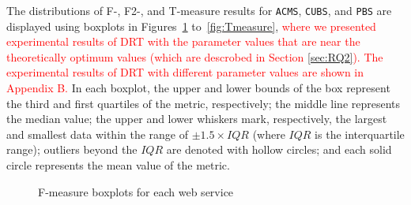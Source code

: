 \documentclass[10pt,journal,compsoc]{IEEEtran}
\begin{document}
The distributions of F-, F2-, and T-measure results for \texttt{ACMS}, \texttt{CUBS}, and \texttt{PBS} are displayed using boxplots in
Figures~\ref{fig:Fmeasure} to~\ref{fig:Tmeasure}, \textcolor{red}{where we presented experimental results of DRT with the parameter values that are near the theoretically optimum values (which are descrobed in Section \ref{sec:RQ2}). The experimental results of DRT with different parameter values are shown in Appendix B.}
In each boxplot, the upper and lower bounds of the box represent the third and first quartiles of the metric, respectively;
the middle line represents the median value;
the upper and lower whiskers mark, respectively, the largest and smallest data within the range of $\pm 1.5 \times IQR$ (where $IQR$ is the interquartile range);
outliers beyond the  $IQR$ are denoted with hollow circles; and
each solid circle represents the mean value of the metric.
\begin{figure}
	\centering
	\caption{F-measure boxplots for each web service}
	\label{fig:Fmeasure}
\end{figure}
\end{document}
